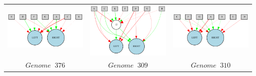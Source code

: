 \begin{table}[h]
\centering
\begin{tabular}{ccc}
\includegraphics[scale=0.4]{include/images/sim_network_1.PNG} & \includegraphics[scale=0.4]{include/images/sim_network_2.PNG} & \includegraphics[scale=0.4]{include/images/sim_network_3.PNG} \\
$$Genome \;  \; 376$$  & $$Genome \;  \; 309$$  & $Genome \;  \; 310$  \\

\end{tabular}
\end{table}
